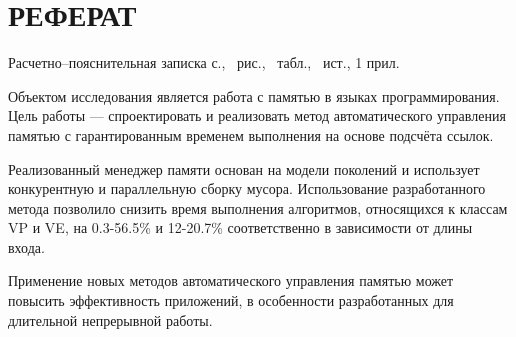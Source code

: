 \part*{РЕФЕРАТ}

Расчетно--пояснительная записка \pageref{LastPage} с., \totalfigures\ рис., \totaltables\ табл., \thetotalbibentries\ ист., 1 прил.

Объектом исследования является работа с памятью в языках программирования. Цель работы --- спроектировать и реализовать метод автоматического управления памятью с гарантированным временем выполнения на основе подсчёта ссылок.

Реализованный менеджер памяти основан на модели поколений и использует конкурентную и параллельную сборку мусора. Использование разработанного метода позволило снизить время выполнения алгоритмов, относящихся к классам VP и VE, на 0.3-56.5\% и 12-20.7\% соответственно в зависимости от длины входа.

Применение новых методов автоматического управления памятью может повысить эффективность приложений, в особенности разработанных для длительной непрерывной работы.

%
%
%
